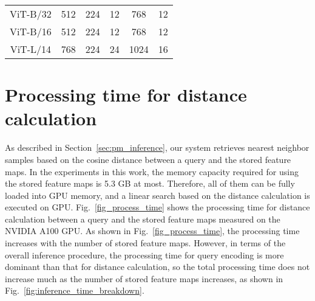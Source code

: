 \documentclass[runningheads]{llncs}
\begin{document}
\begin{table}[t]
\begin{center}
\begin{tabular}{cccccc}
ViT-B/32 & 512 & 224 & \hspace{1pt}12\hspace{1pt} & \hspace{1pt}768\hspace{1pt} & \hspace{1pt}12\hspace{1pt} \\
ViT-B/16 & 512 & 224 & \hspace{1pt}12\hspace{1pt} & \hspace{1pt}768\hspace{1pt} & \hspace{1pt}12\hspace{1pt} \\
ViT-L/14 & 768 & 224 & \hspace{1pt}24\hspace{1pt} & \hspace{1pt}1024\hspace{1pt} & \hspace{1pt}16\hspace{1pt} \\ \hline

\end{tabular}
\label{table:detail_image_encoder}
\end{center}
\end{table}



\section{Processing time for distance calculation}

As described in Section~\ref{sec:pm_inference}, our system retrieves nearest neighbor samples based on the cosine distance between a query and the stored feature maps.
In the experiments in this work, the memory capacity required for using the stored feature maps is 5.3 GB at most.
Therefore, all of them can be fully loaded into GPU memory, and a linear search based on the distance calculation is executed on GPU.
Fig.~\ref{fig_process_time} shows the processing time for distance calculation between a query and the stored feature maps measured on the NVIDIA A100 GPU.
As shown in Fig.~\ref{fig_process_time}, the processing time increases with the number of stored feature maps.
However, in terms of the overall inference procedure, the processing time for query encoding is more dominant than that for distance calculation, 
so the total processing time does not increase much as the number of stored feature maps increases, as shown in Fig.~\ref{fig:inference_time_breakdown}.
\end{document}
